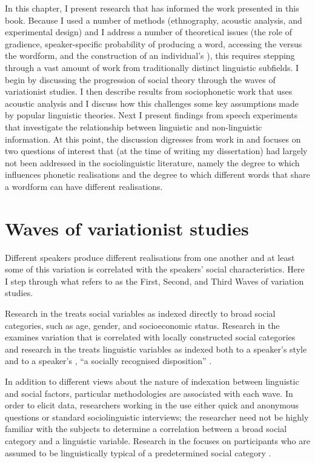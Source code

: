 In this chapter, I present research that has informed the work presented in this book. Because I used a number of methods (ethnography, acoustic analysis, and experimental design) and I address a number of theoretical issues (the role of gradience, speaker-specific probability of producing a word, accessing the  versus the wordform, and the construction of an individual's ), this requires stepping through a vast amount of work from traditionally distinct linguistic subfields. I begin by discussing the progression of social theory through the waves of variationist studies. I then describe results from sociophonetic work that uses acoustic analysis and I discuss how this challenges some key assumptions made by popular linguistic theories. Next I present findings from speech  experiments that investigate the relationship between linguistic and non-linguistic information. At this point, the discussion digresses from work in  and focuses on two questions of interest that (at the time of writing my dissertation) had largely not been addressed in the sociolinguistic literature, namely the degree to which  influences phonetic realisations and the degree to which different words that share a wordform can have different realisations. 
						   
\section{Waves of variationist studies}\label{sec:waves}

Different speakers produce different realisations from one another and at least some of this variation is correlated with the speakers' social characteristics. Here I step through what \citet{eckert2005} refers to as the First, Second, and Third Waves of variation studies. 

Research in the  treats social variables as indexed directly to broad social categories, such as age, gender, and socioeconomic status. Research in the  examines variation that is correlated with locally constructed social categories and research in the  treats linguistic variables as indexed both to a speaker's style and to a speaker's , ``a socially recognised disposition'' \citep[2]{ochs1990}.  

In addition to different views about the nature of indexation between linguistic and social factors, particular methodologies are associated with each wave.  In order to elicit data, researchers working in the  use either quick and anonymous questions or standard sociolinguistic interviews; the researcher need not be highly familiar with the subjects to determine a correlation between a broad social category and a linguistic variable. Research in the  focuses on participants who are assumed to be linguistically typical of a predetermined social category \citep[35]{milroy1987}.

